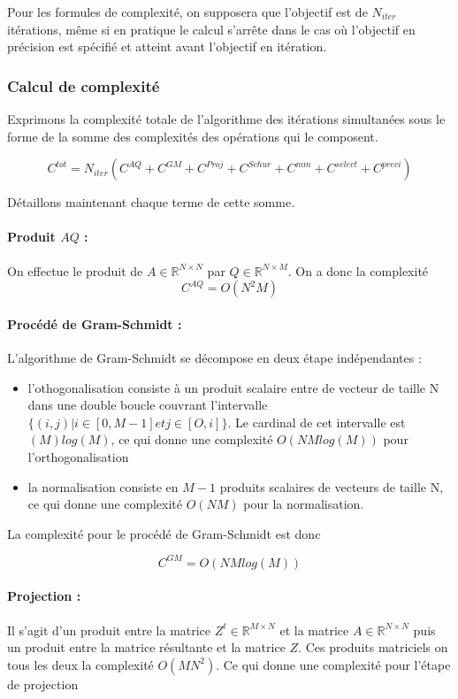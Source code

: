 \documentclass[11pt,a4paper]{article}
\begin{document}
			Pour les formules de complexité, on supposera que l'objectif est de $N_{iter}$ itérations, même si en pratique le calcul s'arrête dans le cas où l'objectif en précision est spécifié et atteint avant l'objectif en itération.

		\subsubsection{Calcul de complexité}

			Exprimons la complexité totale de l'algorithme des itérations simultanées sous le forme de la somme des complexités des opérations qui le composent.

			$$
			C^{tot} = N_{iter} (C^{AQ} + C^{GM} + C^{Proj} + C^{Schur} + C^{mm} + C^{select} + C^{preci})
			$$

			Détaillons maintenant chaque terme de cette somme.

			\paragraph{Produit $AQ$ :} On effectue le produit de $A \in \mathbb{R}^{N\times N}$ par $Q \in \mathbb{R}^{N \times M}$. On a donc la complexité
			$$C^{AQ} = O(N^2M)$$

			\paragraph{Procédé de Gram-Schmidt :} L'algorithme de Gram-Schmidt se décompose en deux étape indépendantes :
			\begin{itemize}
				\item l'othogonalisation consiste à un produit scalaire entre de vecteur de taille N dans une double boucle couvrant l'intervalle $\{(i,j) | i \in [0,M-1] et j \in [O,i]\}$. Le cardinal de cet intervalle est $(M)log(M)$, ce qui donne une complexité $O(NMlog(M))$ pour l'orthogonalisation
				\item la normalisation consiste en $M-1$ produits scalaires de vecteurs de taille N, ce qui donne une complexité $O(NM)$ pour la normalisation.
			\end{itemize}		
			La complexité pour le procédé de Gram-Schmidt est donc
			
			$$C^{GM} = O(NMlog(M))$$

			\paragraph{Projection :} Il s'agit d'un produit entre la matrice $Z^t \in \mathbb{R}^{M\times N}$ et la matrice $A \in \mathbb{R}^{N\times N}$ puis un produit entre la matrice résultante et la matrice $Z$. Ces produits matriciels on tous les deux la complexité $O(MN^2)$. Ce qui donne une complexité pour l'étape de projection
			
\end{document}
